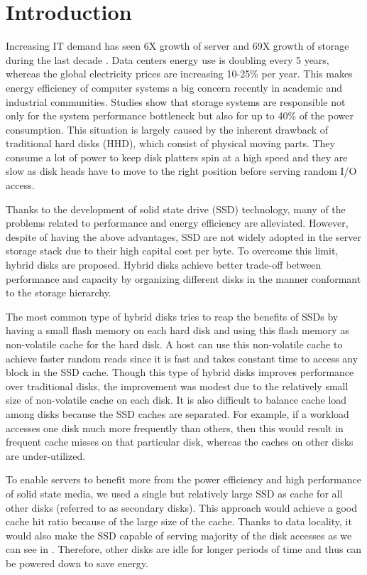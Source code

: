 \section{Introduction}
\label{intro}

Increasing IT demand has seen 6X growth of server and 69X growth of
storage during the last decade \cite{ibm_green_beyond}. Data centers
energy use is doubling every 5 years, whereas the global electricity
prices are increasing 10-25\% per year. This makes energy efficiency
of computer systems a big concern recently in academic and industrial
communities. Studies show that storage systems are responsible not
only for the system performance bottleneck but also for up to 40\% of
the power consumption\cite{storage_40}. This situation is largely
caused by the inherent drawback of traditional hard disks (HHD), which
consist of physical moving parts. They consume a lot of power to keep
disk platters spin at a high speed and they are slow as disk heads
have to move to the right position before serving random I/O access.

Thanks to the development of solid state drive (SSD) technology, many
of the problems related to performance and energy efficiency are
alleviated. However, despite of having the above advantages, SSD are
not widely adopted in the server storage stack due to their high
capital cost per byte. To overcome this limit, hybrid disks are
proposed. Hybrid disks achieve better trade-off between performance
and capacity by organizing different disks in the manner conformant to
the storage hierarchy. 

The most common type of hybrid disks \cite{Bisson07ahybrid} tries to
reap the benefits of SSDs by having a small flash memory on each hard
disk and using this flash memory as non-volatile cache for the hard
disk. A host can use this non-volatile cache to achieve faster random
reads since it is fast and takes constant time to access any block in
the SSD cache. Though this type of hybrid disks improves performance
over traditional disks, the improvement was modest due to the
relatively small size of non-volatile cache on each disk. It is also
difficult to balance cache load among disks because the SSD caches are
separated. For example, if a workload accesses one disk much more
frequently than others, then this would result in frequent cache
misses on that particular disk, whereas the caches on other disks are
under-utilized. 

To enable servers to benefit more from the power efficiency and high
performance of solid state media, we used a single but relatively
large SSD as cache for all other disks (referred to as secondary
disks). This approach would achieve a good cache hit ratio because of
the large size of the cache. Thanks to data locality, it would also
make the SSD capable of serving majority of the disk accesses as we
can see in \cite{Debnath_SkimpyStash, Debnath_Bloomflash,
flashcache_experiments}. Therefore, other disks are idle for longer
periods of time and thus can be powered down to save energy. 

